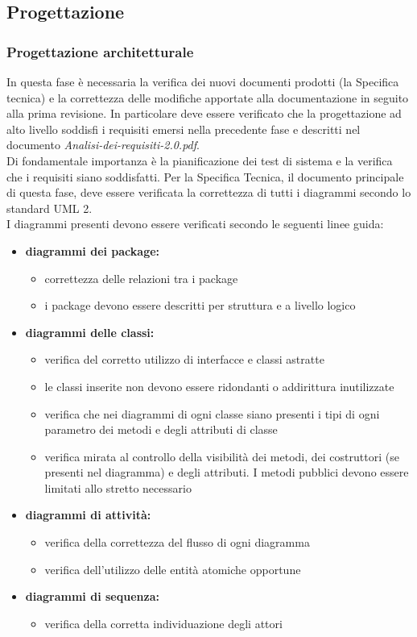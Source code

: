 \documentclass[a4paper,11pt]{article}
\begin{document}
\subsection{Progettazione}
\subsubsection{Progettazione architetturale}
In questa fase è necessaria la verifica dei nuovi documenti prodotti (la Specifica tecnica) e la correttezza delle modifiche apportate alla documentazione in seguito alla prima revisione. In particolare deve essere verificato che la progettazione ad alto livello soddisfi i requisiti emersi nella precedente fase e descritti nel documento \textit{Analisi-dei-requisiti-2.0.pdf}. \\
Di fondamentale importanza è la pianificazione dei test di sistema e la verifica che i requisiti siano soddisfatti.
Per la Specifica Tecnica, il documento principale di questa fase, deve essere verificata la correttezza di tutti i diagrammi secondo lo standard UML 2. \\
I diagrammi presenti devono essere verificati secondo le seguenti linee guida: 
\begin{itemize}
\item \textbf{diagrammi dei package:} 
\begin{itemize}
\item correttezza delle relazioni tra i package
\item i package devono essere descritti per struttura e a livello logico
\end{itemize}
\item \textbf{diagrammi delle classi:}
\begin{itemize}
\item verifica del corretto utilizzo di interfacce e classi astratte
\item le classi inserite non devono essere ridondanti o addirittura inutilizzate
\item verifica che nei diagrammi di ogni classe siano presenti i tipi di ogni parametro dei metodi e degli attributi di classe
\item verifica mirata al controllo della visibilità dei metodi, dei costruttori (se presenti nel diagramma) e degli attributi. I metodi pubblici devono essere limitati allo stretto necessario
\end{itemize}
\item \textbf{diagrammi di attività:}
\begin{itemize}
\item verifica della correttezza del flusso di ogni diagramma
\item verifica dell'utilizzo delle entità atomiche opportune
\end{itemize}
\item \textbf{diagrammi di sequenza:}
\begin{itemize}
\item verifica della corretta individuazione degli attori
\end{itemize}
\end{itemize}
\end{document}
